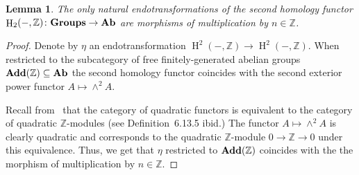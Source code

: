 \documentclass[oneside, 12pt]{amsart}
\theoremstyle{plain}
\numberwithin{equation}{section}
\newtheorem{lemma}{Lemma}
\numberwithin{lemma}{section}
\theoremstyle{remark}
\theoremstyle{definition}
\newcommand{\catname}[1]{{\normalfont\textbf{#1}}}
\DeclareMathOperator{\HH}{H}
\newcommand{\ZZ}{\mathbb{Z}}
\begin{document}
\begin{lemma} \label{lm:endotr} The only natural endotransformations of the second homology functor $\HH_2(-, \ZZ)\colon \catname{Groups}\to \catname{Ab}$ 
 are morphisms of multiplication by $n \in \ZZ$.
\end{lemma}
\begin{proof}
 Denote by $\eta$ an endotransformation $\HH^2(-, \ZZ) \to \HH^2(-, \ZZ)$.
 When restricted to the subcategory of free finitely-generated abelian groups $\catname{Add}(\ZZ) \subseteq \catname{Ab}$ the second homology functor
 coincides with the second exterior power functor $A \mapsto \wedge^2A$. 
 
 Recall from~\cite[Theorem~6.13.12]{Ba96} that the category of quadratic functors is equivalent to the category of quadratic $\ZZ$-modules (see Definition~6.13.5 ibid.)
 The functor $A \mapsto \wedge^2A$ is clearly quadratic and corresponds to the quadratic $\ZZ$-module $0 \to \ZZ \to 0$ under this equivalence.
 Thus, we get that $\eta$ restricted to $\catname{Add}(\ZZ)$ coincides with the the morphism of multiplication by $n\in \ZZ$.
 
\end{proof}
\end{document}
